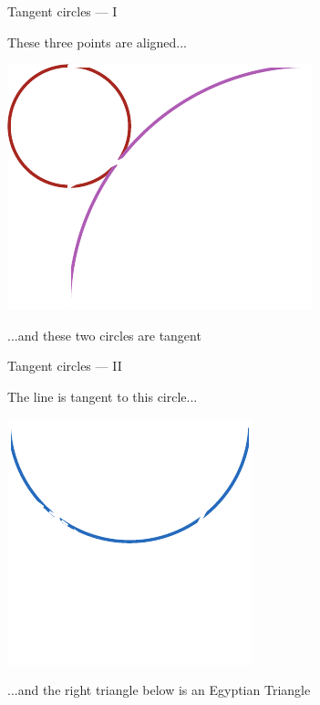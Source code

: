 \documentclass[14pt]{beamer}
\begin{document}

    \begin{frame}{Tangent circles --- I}
        \begin{center}
            These three points are aligned...
        \end{center}
        \hspace{3.92em} \includegraphics[scale=1.0]{figures/figure019d.pdf} \\
        \begin{center}
             ...and these two circles are tangent
        \end{center}
    \end{frame}


    \begin{frame}{Tangent circles --- II}
        \begin{center}
            The line is tangent to this circle...
        \end{center}
        \hspace{6.18em} \includegraphics[scale=1.0]{figures/figure019e.pdf} \\
        \begin{center}
             ...and the right triangle below is an Egyptian Triangle
        \end{center}
    \end{frame}
\end{document}
